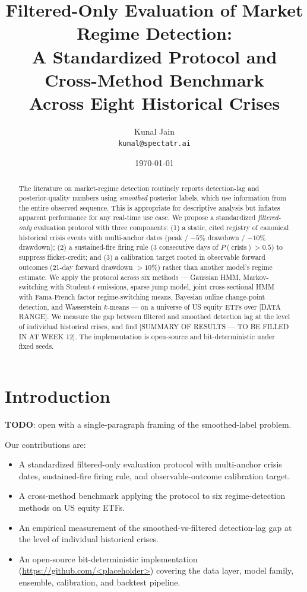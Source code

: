 \documentclass[11pt]{article}
\title{%
  Filtered-Only Evaluation of Market Regime Detection: \\
  A Standardized Protocol and Cross-Method Benchmark \\
  Across Eight Historical Crises
}
\author{Kunal Jain \\ \texttt{kunal@spectatr.ai}}
\date{\today}
\begin{document}
\maketitle

\begin{abstract}
The literature on market-regime detection routinely reports detection-lag and
posterior-quality numbers using \emph{smoothed} posterior labels, which use
information from the entire observed sequence. This is appropriate for
descriptive analysis but inflates apparent performance for any real-time use
case. We propose a standardized \emph{filtered-only} evaluation protocol with
three components: (1) a static, cited registry of canonical historical crisis
events with multi-anchor dates (peak / $-5\%$ drawdown / $-10\%$ drawdown);
(2) a sustained-fire firing rule (3 consecutive days of $P(\text{crisis}) >
0.5$) to suppress flicker-credit; and (3) a calibration target rooted in
observable forward outcomes (21-day forward drawdown $> 10\%$) rather than
another model's regime estimate. We apply the protocol across six methods ---
Gaussian HMM, Markov-switching with Student-$t$ emissions, sparse jump model,
joint cross-sectional HMM with Fama-French factor regime-switching means,
Bayesian online change-point detection, and Wasserstein $k$-means --- on a
universe of US equity ETFs over [DATA RANGE]. We measure the gap between
filtered and smoothed detection lag at the level of individual historical
crises, and find [SUMMARY OF RESULTS — TO BE FILLED IN AT WEEK 12]. The
implementation is open-source and bit-deterministic under fixed seeds.
\end{abstract}

\section{Introduction}
\label{sec:intro}

\textbf{TODO}: open with a single-paragraph framing of the smoothed-label problem.

Our contributions are:
\begin{itemize}[leftmargin=*]
  \item A standardized filtered-only evaluation protocol with multi-anchor
    crisis dates, sustained-fire firing rule, and observable-outcome
    calibration target.
  \item A cross-method benchmark applying the protocol to six regime-detection
    methods on US equity ETFs.
  \item An empirical measurement of the smoothed-vs-filtered detection-lag gap
    at the level of individual historical crises.
  \item An open-source bit-deterministic implementation
    (\url{https://github.com/<placeholder>}) covering the data layer, model
    family, ensemble, calibration, and backtest pipeline.
\end{itemize}
\end{document}
